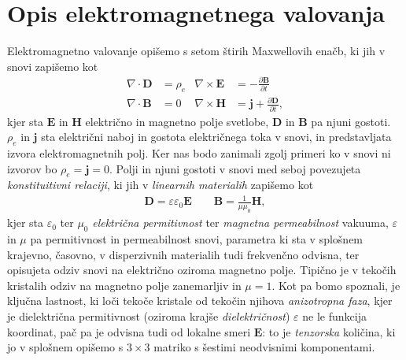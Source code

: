 \documentclass[longbibliography,slovene,a4paper,12pt]{book}
\begin{document}
\section{Opis elektromagnetnega valovanja}
Elektromagnetno valovanje opišemo s setom štirih Maxwellovih enačb, ki jih v snovi zapišemo kot
\begin{subequations}
\label{maxwell}
\begin{align}
\nabla \cdot \mathbf{D} &= \rho_e & \nabla \times \mathbf{E} &= -\frac{\partial \mathbf{B}}{\partial t}\label{a}\\
\nabla \cdot \mathbf{B} &= 0   & \nabla \times \mathbf{H} &= \mathbf{j} +  \frac{\partial \mathbf{D}}{\partial t} \label{b},
\end{align}
\end{subequations}
kjer sta $\mathbf{E}$ in $\mathbf{H}$ električno in magnetno polje svetlobe, $\mathbf{D}$ in $\mathbf{B}$ pa njuni gostoti. $\rho_e$ in $\mathbf{j}$ sta električni naboj in gostota električnega toka v snovi, in predstavljata izvora elektromagnetnih polj\cite{podgornik}. Ker nas bodo zanimali zgolj primeri ko v snovi ni izvorov bo $\rho_e = \mathbf{j} = 0$. Polji in njuni gostoti v snovi med seboj povezujeta \emph{konstituitivni relaciji}, ki jih v \emph{linearnih materialih} zapišemo kot
\begin{align}
\mathbf{D} = \varepsilon \varepsilon_0 \mathbf{E} \quad \quad \mathbf{B} = \frac{1}{\mu \mu_0} \mathbf{H},
\label{constituitive}
\end{align}
kjer sta $\varepsilon_0$ ter $\mu_0$ \emph{električna permitivnost} ter \emph{magnetna permeabilnost} vakuuma, $\varepsilon$ in $\mu$ pa permitivnost in permeabilnost snovi, parametra ki sta v splošnem krajevno, časovno, v disperzivnih materialih tudi frekvenčno odvisna, ter opisujeta odziv snovi na električno oziroma magnetno polje. Tipično je v tekočih kristalih odziv na magnetno polje zanemarljiv in $\mu = 1$. Kot pa bomo spoznali, je ključna lastnost, ki loči tekoče kristale od tekočin njihova \emph{anizotropna faza}, kjer je dielektrična permitivnost (oziroma krajše \emph{dielektričnost}) $\varepsilon$ ne le funkcija koordinat, pač pa je odvisna tudi od lokalne smeri $\mathbf{E}$: to je \emph{tenzorska} količina, ki jo v splošnem opišemo s $3 \times 3$ matriko s šestimi neodvisnimi komponentami\cite{podgornik}. \\
\end{document}

